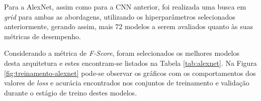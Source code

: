 
Para a AlexNet, assim como para a CNN anterior, foi realizada uma busca em \emph{grid} para ambas as abordagens, utilizando os hiperparâmetros selecionados anteriormente, gerando assim, mais $72$ modelos a serem avaliados quanto às suas métricas de desempenho.

Considerando a métrica de \emph{F-Score}, foram selecionados os melhores modelos  desta arquitetura e estes encontram-se listados na Tabela \ref{tab:alexnet}. Na Figura \ref{fig:treinamento-alexnet} pode-se observar os gráficos com os comportamentos dos valores de \emph{loss} e acurácia encontrados nos conjuntos de treinamento e validação durante o estágio de treino destes modelos.

\begin{table}[h!]
\centering
\caption{Detalhamento dos melhores modelos obtidos com a arquitetura AlexNet para cada uma das abordagens consideradas neste trabalho.}
\label{tab:alexnet}
\end{table}


